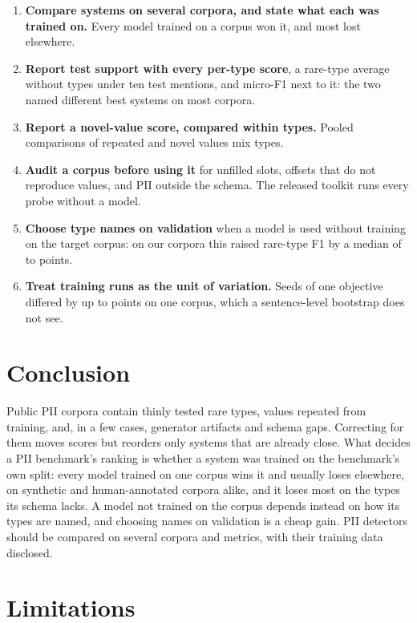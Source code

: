 \documentclass[11pt]{article}
\begin{document}
\begin{enumerate}
\item \textbf{Compare systems on several corpora, and state what each
was trained on.} Every model trained on a corpus won it, and most lost
elsewhere.
\item \textbf{Report test support with every per-type score}, a
rare-type average without types under ten test mentions, and micro-F1
next to it: the two named different best systems on most corpora.
\item \textbf{Report a novel-value score, compared within types.}
Pooled comparisons of repeated and novel values mix types.
\item \textbf{Audit a corpus before using it} for unfilled slots,
offsets that do not reproduce values, and PII outside the schema. The
released toolkit runs every probe without a model.
\item \textbf{Choose type names on validation} when a model is used
without training on the target corpus: on our corpora this raised
rare-type F1 by a median of  to  points.
\item \textbf{Treat training runs as the unit of variation.} Seeds of
one objective differed by up to  points on one
corpus, which a sentence-level bootstrap does not see.
\end{enumerate}

\section{Conclusion}
\label{sec:conclusion}

Public PII corpora contain thinly tested rare types, values repeated
from training, and, in a few cases, generator artifacts and schema
gaps. Correcting for them moves scores but reorders only systems that
are already close. What decides a PII benchmark's ranking is whether a
system was trained on the benchmark's own split: every model trained on
one corpus wins it and usually loses elsewhere, on synthetic and
human-annotated corpora alike, and it loses most on the types its
schema lacks. A model not trained on the corpus depends instead on how
its types are named, and choosing names on validation is a cheap gain. PII detectors should be
compared on several corpora and metrics, with their training data
disclosed.

\FloatBarrier
\section*{Limitations}
\end{document}
